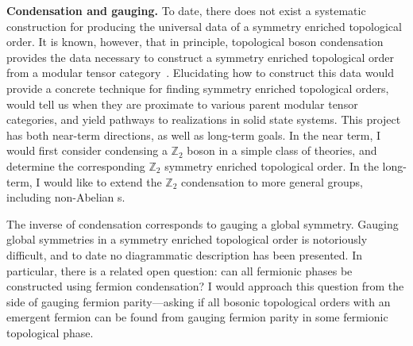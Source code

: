 \hfill \break
{\large \textbf{Condensation and gauging.}}
To date, there does not exist a systematic construction for producing the universal data of a symmetry enriched topological order.
It is known, however, that in principle, topological boson condensation provides the data necessary to construct a symmetry enriched topological order from a modular tensor category~\cite{Etingof2009}. Elucidating how to construct this data would provide a concrete technique for finding  symmetry enriched topological orders, would tell us when they are proximate to various parent modular tensor categories, and  yield pathways to realizations in solid state systems. This project has both near-term directions, as well as long-term  goals. In the near term, I would first consider condensing a $\mathbb{Z}_2$ boson in a simple class of theories, and determine the corresponding $\mathbb{Z}_2$ symmetry enriched topological order. In the long-term, I would like to extend the $\mathbb{Z}_2$ condensation to more general groups, including non-Abelian s.


The inverse of condensation corresponds to gauging a global symmetry.
Gauging global symmetries in a symmetry enriched topological order is notoriously difficult, and to date no diagrammatic description has been presented.
In particular, there is a related open question: can all fermionic phases be constructed using fermion condensation?
I would approach this question from the side of gauging fermion parity---asking if all bosonic topological orders with an emergent fermion can be found from gauging fermion parity in some fermionic topological phase.

